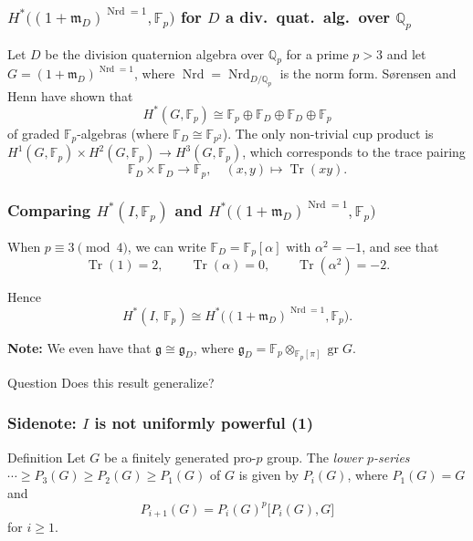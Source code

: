 \documentclass{beamer}
\newcommand*\Q{\mathbb{Q}}
\newcommand*\F{\mathbb{F}}
\DeclareMathOperator{\Tr}{Tr} %
\DeclareMathOperator{\gr}{gr} %
\DeclareMathOperator{\Nrd}{Nrd}
\newcommand*{\lie}[1]{\mathfrak{#1}} %
\newcommand*\iso{\cong} %
\newcommand*\idm{\mathfrak{m}}
\begin{document}
\begin{frame}
  \frametitle{$H^{*}\bigl( (1+\idm_{D})^{\Nrd = 1},\F_{p} \bigr)$ for $D$ a div.\ quat.\ alg.\ over $\Q_{p}$}

  Let $D$ be the division quaternion algebra over $\Q_{p}$ for a prime $p>3$ and let $G = (1+\idm_{D})^{\Nrd = 1}$, where $\Nrd = \Nrd_{D/\Q_{p}}$ is the norm form. Sørensen and Henn have shown that
  \[
    H^{*}(G,\F_{p}) \iso \F_{p} \oplus \F_{D} \oplus \F_{D} \oplus \F_{p}
  \]
  of graded $\F_{p}$-algebras (where $\F_{D} \iso \F_{p^{2}}$). The only non-trivial cup product is $H^{1}(G,\F_{p}) \times H^{2}(G,\F_{p}) \to H^{3}(G,\F_{p})$, which corresponds to the trace pairing \[\F_{D} \times \F_{D} \to \F_{p}, \quad (x,y) \mapsto \Tr(xy). \]
\end{frame}

\begin{frame}
  \frametitle{Comparing $H^{*}(I,\F_{p})$ and $H^{*}\bigl( (1+\idm_{D})^{\Nrd = 1},\F_{p} \bigr)$}

  When $p \equiv 3 \pmod{4}$, we can write $\F_{D} = \F_{p}[\alpha]$ with $\alpha^{2} = -1$, and see that
  \[
    \Tr(1) = 2, \qquad \Tr(\alpha) = 0, \qquad \Tr(\alpha^{2}) = -2.
  \]
  \pause

  Hence
  \[
    H^{*}(I,\ \F_{p}) \iso H^{*}\bigl( (1+\idm_{D})^{\Nrd = 1}, \F_{p} \bigr).
  \]

  \textbf{Note:} We even have that $\lie{g} \iso \lie{g}_{D}$, where $\lie{g}_{D} = \F_{p} \otimes_{\F_{p}[\pi]} \gr G$.

  \begin{block}{Question}
    Does this result generalize?
  \end{block}
\end{frame}

\begin{frame}
  \frametitle{Sidenote: $I$ is not uniformly powerful (1)}

  \begin{block}{Definition}
    Let $G$ be a finitely generated pro-$p$ group. The \emph{lower $p$-series} $\dotsb \geq P_{3}(G) \geq P_{2}(G) \geq P_{1}(G)$ of $G$ is given by $P_{i}(G)$, where $P_{1}(G) = G$ and
    \begin{equation*}
      P_{i+1}(G) = P_{i}(G)^{p}\bigl[ P_{i}(G),G \bigr]
    \end{equation*}
    for $i \geq 1$.
  \end{block}
\end{frame}
\end{document}
